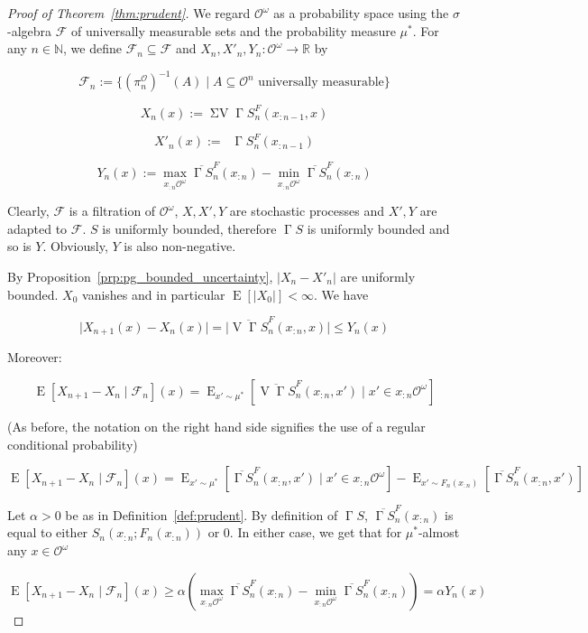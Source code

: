 \documentclass[11pt]{article}
\theoremstyle{definition}
\theoremstyle{plain}
\newcommand{\Nats}{\mathbb{N}}
\newcommand{\Reals}{\mathbb{R}}
\newcommand{\A}[1]{\lvert #1 \rvert}
\DeclareMathOperator{\E}{E}
\newcommand{\Ob}{\mathcal{O}}
\newcommand{\OO}{\Ob^\omega}
\newcommand{\PO}{\pi^\Ob}
\DeclareMathOperator{\V}{V}
\DeclareMathOperator{\SV}{\Sigma V}
\DeclareMathOperator{\SVM}{\Sigma V_{\min}}
\DeclareMathOperator{\PG}{\Gamma}
\newcommand{\F}{\mathcal{F}}
\begin{document}
\begin{proof}[Proof of Theorem~\ref{thm:prudent}]

We regard ${\OO}$ as a probability space using the ${\sigma}$-algebra $\F$ of universally measurable sets and the probability measure ${\mu^*}$. For any ${n \in \Nats}$, we define ${\F_n \subseteq \F}$ and $X_n,X'_n,Y_n: \OO \rightarrow \Reals$ by 

$$\F_n := \{\left(\PO_n\right)^{-1}\left(A\right) \mid A \subseteq \Ob^n \text{ universally measurable}\}$$

$$X_n\left(x\right):= \SV \PG{S}^F_{n}\left(x_{:n-1},x\right)$$

$$X'_n\left(x\right):= \SVM \PG{S}^F_{n}\left(x_{:n-1}\right)$$

$$Y_n\left(x\right):=\max_{x_{:n}\OO} \overline{\PG{S}}^F_{n}\left(x_{:n}\right) - \min_{x_{:n}\OO} \overline{\PG{S}}^F_{n}\left(x_{:n}\right)$$

Clearly, ${\F}$ is a filtration of ${\OO}$, ${X,X',Y}$ are stochastic processes and ${X',Y}$ are adapted to ${\F}$. ${S}$ is uniformly bounded, therefore ${\PG{S}}$  is uniformly bounded and so is ${Y}$. Obviously, ${Y}$ is also non-negative.

By Proposition~\ref{prp:pg_bounded_uncertainty}, ${\A{X_n-X'_n}}$ are uniformly bounded. ${X_0}$ vanishes and in particular ${\E[\A{X_0}] < \infty}$. We have

$$\A{X_{n+1}\left(x\right)-X_n\left(x\right)} = \A{\overline{\V{\PG{S}}}_{n}^F\left(x_{:n},x\right)} \leq Y_n\left(x\right)$$

Moreover:

$$\E[X_{n+1} - X_n \mid \F_n]\left(x\right) = \E_{x' \sim \mu^*}[\overline{\V{\PG{S}}}_{n}^F\left(x_{:n},x'\right) \mid x' \in x_{:n}\OO]$$

(As before, the notation on the right hand side signifies the use of a regular conditional probability)

$$\E[X_{n+1} - X_n \mid \F_n]\left(x\right) = \E_{x' \sim \mu^*}[\overline{\PG{S}}_{n}^F\left(x_{:n},x'\right) \mid x' \in x_{:n}\OO] - \E_{x' \sim F_n\left(x_{:n}\right)}[\overline{\PG{S}}_{n}^F\left(x_{:n},x'\right)]$$

Let $\alpha > 0$ be as in Definition~\ref{def:prudent}. By definition of $\PG{S}$, $\overline{\PG{S}}_{n}^F\left(x_{:n}\right)$ is equal to either $S_n\left(x_{:n};F_n\left(x_{:n}\right)\right)$ or 0. In either case, we get that for $\mu^*$-almost any $x \in \OO$

$$\E[X_{n+1} - X_n \mid \F_n]\left(x\right) \geq \alpha \left(\max_{x_{:n}\OO} \overline{\PG{S}}_{n}^F\left(x_{:n}\right) - \min_{x_{:n}\OO} \overline{\PG{S}}_{n}^F\left(x_{:n}\right)\right) = \alpha Y_n\left(x\right)$$


\end{proof}
\end{document}
